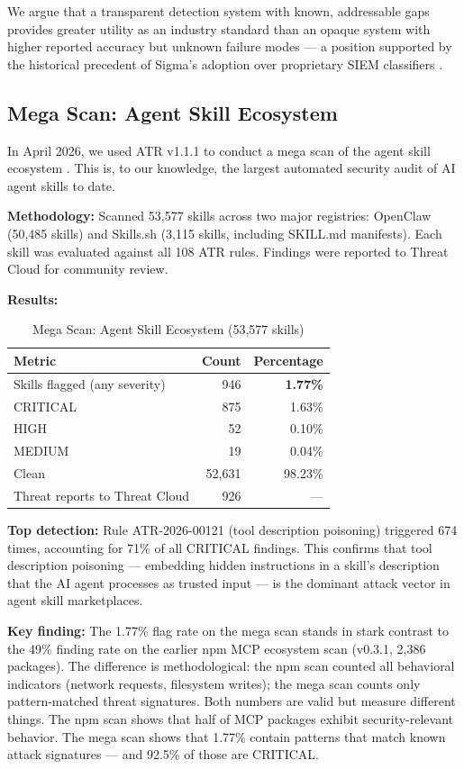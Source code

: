 \documentclass[11pt,letterpaper]{article}
\begin{document}
We argue that a transparent detection system with known, addressable gaps provides greater utility as an industry standard than an opaque system with higher reported accuracy but unknown failure modes --- a position supported by the historical precedent of Sigma's adoption over proprietary SIEM classifiers \cite{sigma}.


\subsection{Mega Scan: Agent Skill Ecosystem}

In April 2026, we used ATR v1.1.1 to conduct a mega scan of the agent skill ecosystem \cite{atrscanmega}. This is, to our knowledge, the largest automated security audit of AI agent skills to date.

\textbf{Methodology:} Scanned 53,577 skills across two major registries: OpenClaw (50,485 skills) and Skills.sh (3,115 skills, including SKILL.md manifests). Each skill was evaluated against all 108 ATR rules. Findings were reported to Threat Cloud for community review.

\textbf{Results:}

\begin{table}[htbp]
\centering
\caption{Mega Scan: Agent Skill Ecosystem (53,577 skills)}
\label{tab:megascan}
\begin{tabular}{lrr}
\toprule
\textbf{Metric} & \textbf{Count} & \textbf{Percentage} \\
\midrule
Skills flagged (any severity) & 946 & \textbf{1.77\%} \\
CRITICAL & 875 & 1.63\% \\
HIGH & 52 & 0.10\% \\
MEDIUM & 19 & 0.04\% \\
Clean & 52,631 & 98.23\% \\
Threat reports to Threat Cloud & 926 & --- \\
\bottomrule
\end{tabular}
\end{table}

\textbf{Top detection:} Rule ATR-2026-00121 (tool description poisoning) triggered 674 times, accounting for 71\% of all CRITICAL findings. This confirms that tool description poisoning --- embedding hidden instructions in a skill's description that the AI agent processes as trusted input --- is the dominant attack vector in agent skill marketplaces.

\textbf{Key finding:} The 1.77\% flag rate on the mega scan stands in stark contrast to the 49\% finding rate on the earlier npm MCP ecosystem scan (v0.3.1, 2,386 packages). The difference is methodological: the npm scan counted all behavioral indicators (network requests, filesystem writes); the mega scan counts only pattern-matched threat signatures. Both numbers are valid but measure different things. The npm scan shows that half of MCP packages exhibit security-relevant behavior. The mega scan shows that 1.77\% contain patterns that match known attack signatures --- and 92.5\% of those are CRITICAL.
\end{document}
